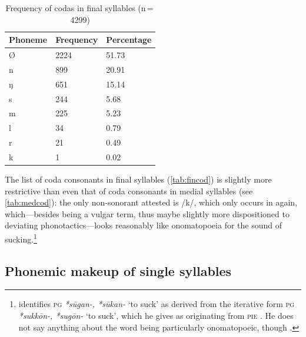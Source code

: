 \begin{table}\centering
\caption[Frequency of codas in final syllables]{Frequency of codas in final 
syllables (n\,=\,4299)}
\begin{tabu} to 0.67\linewidth{X X[c] X[c]}
\tableheaderfont\toprule
Phoneme
	& Frequency
	& Percentage
	\\
	
\toprule

Ø
	& 2224
	& 51.73\pct
	\\

\midrule

n
	& 899
	& 20.91\pct
	\\

ŋ
	& 651
	& 15.14\pct
	\\

s
	& 244
	& 5.68\pct
	\\

m
	& 225
	& 5.23\pct
	\\

l
	& 34
	& 0.79\pct
	\\

r
	& 21
	& 0.49\pct
	\\

k
	& 1
	& 0.02\pct
	\\

\bottomrule
\end{tabu}
\label{tab:fincod}
\end{table}

The list of coda consonants in final syllables (\autoref{tab:fincod}) is
slightly more restrictive than even that of coda consonants in medial syllables
(see \autoref{tab:medcod}): the only non-sonorant attested is /k/, which only
occurs in  again, which---besides being a vulgar
term, thus maybe slightly more dispositioned to deviating phonotactics---looks
reasonably like onomatopoeia for the sound of
sucking.\footnote{\citet{kroonen2013} identifies \textsc{pg} \textit{*sūgan-,
*sūkan-} `to suck' as derived from the iterative form \textsc{pg}
\textit{*sukkōn-, *sugōn-} `to suck', which he gives as originating from
\textsc{pie} . He does not say anything about the
word being particularly onomatopoeic, though \citep[489--490]{kroonen2013}.}
%

\subsection{Phonemic makeup of single syllables}

